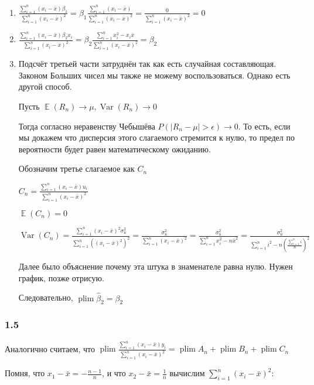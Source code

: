 \documentclass[10pt, a4paper]{extarticle}
\def \hb{\hat{\beta}}
\DeclareMathOperator{\E}{\mathbb{E}}
\DeclareMathOperator{\plim}{plim}
\DeclareMathOperator{\Var}{Var}
\begin{document}
\begin{enumerate}
	\item $\frac{\sum_{i = 1}^n(x_i - \bar{x})\beta_1}{\sum_{i = 1}^n(x_i - \bar{x})^2} = \beta_1 \frac{\sum_{i = 1}^n(x_i - \bar{x})}{\sum_{i = 1}^n(x_i - \bar{x})^2} = \frac{0}{\sum_{i = 1}^n(x_i - \bar{x})^2} = 0$
	
	\item $\frac{\sum_{i = 1}^n(x_i - \bar{x})\beta_2x_i}{\sum_{i = 1}^n(x_i - \bar{x})^2} = \beta_2 \frac{\sum_{i = 1}^n x_i^2 - x_i\bar{x}}{\sum_{i = 1}^n(x_i - \bar{x})^2} = \beta_2$
	
	\item Подсчёт третьей части затруднён так как есть случайная составляющая. Законом Больших чисел мы также не можему воспользоваться. Однако есть другой способ. 
	
	Пусть $\E(R_n) \to \mu, \Var(R_n) \to 0$
	
	Тогда согласно неравенству Чебышёва $P(|R_n - \mu| > \epsilon) \to 0$. То есть, если мы докажем что дисперсия этого слагаемого стремится к нулю, то предел по вероятности будет равен математическому ожиданию.
	
	Обозначим третье слагаемое как $C_n$
	
	$C_n = \frac{\sum_{i = 1}^n(x_i - \bar{x})u_i}{\sum_{i = 1}^n(x_i - \bar{x})^2}$
	
	$\E(C_n) = 0$
	
	$\Var(C_n) =  \frac{\sum_{i = 1}^n(x_i - \bar{x})^2 \sigma_u^2}{\sum_{i = 1}^n((x_i - \bar{x})^2)^2} = \frac{\sigma_u^2}{\sum_{i = 1}^n(x_i - \bar{x})^2} = \frac{\sigma_u^2}{\sum_{i = 1}^n x_i^2 - n\bar{x}^2} = \frac{\sigma_u^2}{\sum_{i = 1}^n i^2 - n \left( \frac{\sum_{i = 1}^n i}{n} \right)^2}$
	
	Далее было объяснение почему эта штука в знаменателе равна нулю. Нужен график, позже отрисую.
	
	Следовательно, $\plim \hb_2 = \beta_2$
	
	
\end{enumerate}

\subsubsection*{1.5}
Аналогично считаем, что  $\plim \frac{\sum_{i = 1}^n(x_i - \bar{x})y_i}{\sum_{i = 1}^n(x_i - \bar{x})^2} = \plim A_n + \plim B_n + \plim C_n$

Помня, что $x_1 - \bar{x} = -\frac{n - 1}{n}$, и что $x_2 - \bar{x} = \frac{1}{n}$ вычислим $\sum_{i = 1}^n (x_i - \bar{x})^2$:
\end{document}
